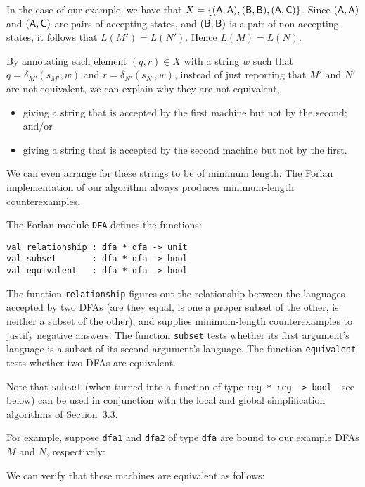 In the case of our example, we have that
$X=\{(\mathsf{A},\mathsf{A}), (\mathsf{B},\mathsf{B}), (\mathsf{A},\mathsf{C})\}$.
Since $(\mathsf{A},\mathsf{A})$ and $(\mathsf{A},\mathsf{C})$ are pairs of accepting states,
and $(\mathsf{B},\mathsf{B})$ is a pair of non-accepting states, it follows
that $L(M')=L(N')$.  Hence $L(M)=L(N)$.

By annotating each element $(q,r)\in X$ with a string $w$ such that
$q=\delta_{M'}(s_{M'},w)$ and $r=\delta_{N'}(s_{N'},w)$, instead of
just reporting that $M'$ and $N'$ are not equivalent, we can
explain why they are not equivalent,
\begin{itemize}
\item giving a string that is accepted by the first machine but not by
  the second; and/or

\item giving a string that is accepted by the second machine but not
  by the first.
\end{itemize}
We can even arrange for these strings to be of minimum length.
The Forlan implementation of our algorithm always produces minimum-length
counterexamples.

The Forlan module \texttt{DFA} defines the functions:
\begin{verbatim}
val relationship : dfa * dfa -> unit
val subset       : dfa * dfa -> bool
val equivalent   : dfa * dfa -> bool
\end{verbatim}
%
%
%
The function \texttt{relationship} figures out the relationship
between the languages accepted by two DFAs (are they equal, is one a
proper subset of the other, is neither a subset of the other), and
supplies minimum-length counterexamples to justify negative answers.
The function \texttt{subset} tests whether its first argument's
language is a subset of its second argument's language.
The function \texttt{equivalent} tests whether two DFAs are
equivalent.

Note that \texttt{subset} (when turned into a function of type
\texttt{reg~*~reg~->~bool}---see below) can be used in conjunction
with the local and global simplification algorithms of Section~3.3.

For example, suppose \texttt{dfa1} and \texttt{dfa2} of type \texttt{dfa} are
bound to our example DFAs $M$ and $N$, respectively:
\begin{center}

\end{center}
We can verify that these machines are equivalent as follows:


